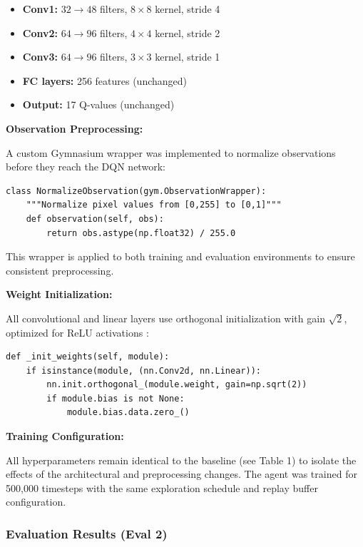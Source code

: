 \documentclass[twocolumn]{article}
\begin{document}
\begin{itemize}
    \item \textbf{Conv1:} $32 \rightarrow 48$ filters, $8 \times 8$ kernel, stride 4
    \item \textbf{Conv2:} $64 \rightarrow 96$ filters, $4 \times 4$ kernel, stride 2  
    \item \textbf{Conv3:} $64 \rightarrow 96$ filters, $3 \times 3$ kernel, stride 1
    \item \textbf{FC layers:} 256 features (unchanged)
    \item \textbf{Output:} 17 Q-values (unchanged)
\end{itemize}

\textbf{Observation Preprocessing:}

A custom Gymnasium wrapper was implemented to normalize observations before they reach the DQN network:

\begin{lstlisting}[style=mypython]
class NormalizeObservation(gym.ObservationWrapper):
    """Normalize pixel values from [0,255] to [0,1]"""
    def observation(self, obs):
        return obs.astype(np.float32) / 255.0
\end{lstlisting}

This wrapper is applied to both training and evaluation environments to ensure consistent preprocessing.

\textbf{Weight Initialization:}

All convolutional and linear layers use orthogonal initialization with gain $\sqrt{2}$, optimized for ReLU activations \parencite{he2015delving}:

\begin{lstlisting}[style=mypython]
def _init_weights(self, module):
    if isinstance(module, (nn.Conv2d, nn.Linear)):
        nn.init.orthogonal_(module.weight, gain=np.sqrt(2))
        if module.bias is not None:
            module.bias.data.zero_()
\end{lstlisting}

\textbf{Training Configuration:}

All hyperparameters remain identical to the baseline (see Table 1) to isolate the effects of the architectural and preprocessing changes. The agent was trained for 500,000 timesteps with the same exploration schedule and replay buffer configuration.

\subsubsection*{Evaluation Results (Eval 2)}
\end{document}
